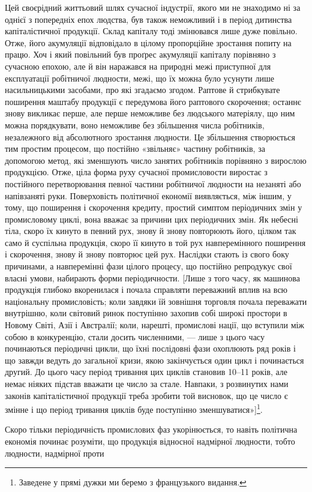 
Цей своєрідний життьовий шлях сучасної індустрії, якого ми не
знаходимо ні за однієї з попередніх епох людства, був також
неможливий і в період дитинства капіталістичної продукції. Склад
капіталу тоді змінювався лише дуже повільно. Отже, його акумуляції
відповідало в цілому пропорційне зростання попиту на
працю. Хоч і який повільний був проґрес акумуляції капіталу
порівняно з сучасною епохою, але й він наражався на природні
межі приступної для експлуатації робітничої людности, межі, що
їх можна було усунути лише насильницькими засобами, про які
згадаємо згодом. Раптове й стрибкувате поширення маштабу
продукції є передумова його раптового скорочення; останнє
знову викликає перше, але перше неможливе без людського
матеріялу, що ним можна порядкувати, воно неможливе без
збільшення числа робітників, незалежного від абсолютного зростання
людности. Це збільшення створюється тим простим процесом,
що постійно «звільняє» частину робітників, за допомогою
метод, які зменшують число занятих робітників порівняно з
вирослою продукцією. Отже, ціла форма руху сучасної промисловости
виростає з постійного перетворювання певної частини
робітничої людности на незаняті або напівзаняті руки. Поверховість
політичної економії виявляється, між іншим, у тому, що
поширення і скорочення кредиту, простий симптом періодичних
змін у промисловому циклі, вона вважає за причини цих періодичних
змін. Як небесні тіла, скоро їх кинуто в певний рух,
знову й знову повторюють його, цілком так само й суспільна
продукція, скоро її кинуто в той рух навперемінного поширення
і скорочення, знову й знову повторює цей рух. Наслідки стають
із свого боку причинами, а навперемінні фази цілого процесу,
що постійно репродукує свої власні умови, набирають форми періодичности.
[Лише з того часу, як машинова продукція глибоко
вкоренилася і почала справляти переважний вплив на всю національну
промисловість; коли завдяки їй зовнішня торговля
почала переважати внутрішню, коли світовий ринок поступінно
захопив собі широкі простори в Новому Світі, Азії і Австралії;
коли, нарешті, промислові нації, що вступили між собою в конкуренцію,
стали досить численними, — лише з цього часу починаються
періодичні цикли, що їхні послідовні фази охоплюють
ряд років і що завжди ведуть до загальної кризи, якою закінчується
один цикл і починається другий. До цього часу період
тривання цих циклів становив 10--11 років, але немає ніяких
підстав вважати це число за стале. Навпаки, з розвинутих нами
законів капіталістичної продукції треба зробити той висновок,
що це число є змінне і що період тривання циклів буде поступінно
зменшуватися»]\footnote*{
Заведене у прямі дужки ми беремо з французького видання. 
}.

Скоро тільки періодичність промислових фаз укорінюється,
то навіть політична економія починає розуміти, що продукція
відносної надмірної людности, тобто людности, надмірної проти
\parbreak{}  %
